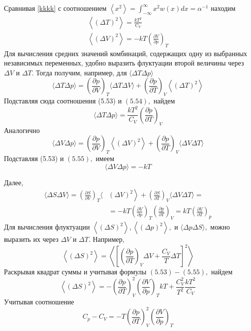 \documentclass[a4paper,12pt]{article} %
\begin{document}
\begin{ttask}
Сравнивая \ref{kkkk} с соотношением $\left\langle x^{2}\right\rangle=\int_{-\infty}^{\infty} x^{2} w(x) d x=\alpha^{-1}$ 
находим
$$
\begin{array}{c}
\left\langle(\Delta T)^{2}\right\rangle=\frac{k T^{2}}{\mathrm{C}_{V}} \\
\left\langle(\Delta V)^{2}\right\rangle=-k T\left(\frac{\partial V}{\partial p}\right)_{T}
\end{array}
$$
Для вычисления средних значений комбинаций, содержащих одну из выбранных независимых переменных, удобно выразить флуктуации второй величины через $\Delta V$ и $\Delta T .$ Тогда получим, например, для $\langle\Delta T \Delta p\rangle$
$$
\langle\Delta T \Delta p\rangle=\left(\frac{\partial p}{\partial V}\right)_{T}\langle\Delta T \Delta V\rangle+\left(\frac{\partial p}{\partial T}\right)_{V}\left\langle(\Delta T)^{2}\right\rangle
$$
Подставляя сюда соотношения (5.53) и $(5.54),$ найдем
$$
\langle\Delta T \Delta p\rangle=\frac{k T^{2}}{C_{V}}\left(\frac{\partial p}{\partial T}\right)_{V}
$$
Аналогично
$$
\langle\Delta V \Delta p\rangle=\left(\frac{\partial p}{\partial V}\right)_{T}\left\langle(\Delta V)^{2}\right\rangle+\left(\frac{\partial p}{\partial T}\right)_{V}\langle\Delta V \Delta T\rangle
$$
Подставляя (5.53) и $(5.55),$ имеем
$$
\langle\Delta V \Delta p\rangle=-k T
$$

Далее,
$$
\begin{aligned}
\langle\Delta S \Delta V\rangle=\left(\frac{\partial S}{\partial V}\right)_{T}\langle&\left.(\Delta V)^{2}\right\rangle+\left(\frac{\partial S}{\partial T}\right)_{V}\langle\Delta V \Delta T\rangle=\\
&=-k T\left(\frac{\partial V}{\partial p}\right)_{T}\left(\frac{\partial p}{\partial T}\right)_{V}=k T\left(\frac{\partial V}{\partial T}\right)_{p}
\end{aligned}
$$
Для вычисления флуктуации $\left\langle(\Delta S)^{2}\right\rangle,\left\langle(\Delta p)^{2}\right\rangle,$ и $\langle\Delta p \Delta S\rangle,$ можно
выразить их через $\Delta V$ и $\Delta T .$ Например,
$$
\left\langle(\Delta S)^{2}\right\rangle=\left\langle\left[\left(\frac{\partial p}{\partial T}\right)_{V} \Delta V+\frac{C_{V}}{T} \Delta T\right]^{2}\right\rangle
$$
Раскрывая квадрат суммы и учитывая формулы $(5.53)-(5.55),$ найдем
$$
\left\langle(\Delta S)^{2}\right\rangle=-\left(\frac{\partial p}{\partial T}\right)_{V}^{2}\left(\frac{\partial V}{\partial p}\right)_{T} k T+\frac{C_{V}^{2}}{T^{2}} \frac{k T^{2}}{C_{V}}
$$
Учитывая соотношение
$$
C_{p}-C_{V}=-T\left(\frac{\partial p}{\partial T}\right)_{V}^{2}\left(\frac{\partial V}{\partial p}\right)_{T}
$$



\end{ttask}
\end{document}
